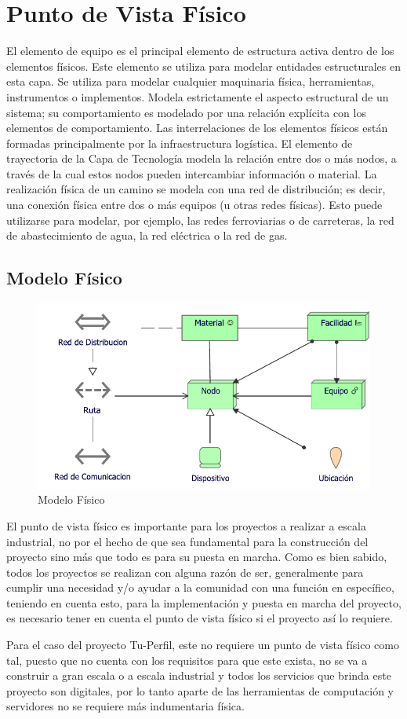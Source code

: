\section{Punto de Vista Físico}

El elemento de equipo es el principal elemento de estructura activa dentro de los elementos físicos. Este elemento se utiliza para modelar entidades estructurales en esta capa. Se utiliza para modelar cualquier maquinaria física, herramientas, instrumentos o implementos. Modela estrictamente el aspecto estructural de un sistema; su comportamiento es modelado por una relación explícita con los elementos de comportamiento.
Las interrelaciones de los elementos físicos están formadas principalmente por la infraestructura logística. El elemento de trayectoria de la Capa de Tecnología modela la relación entre dos o más nodos, a través de la cual estos nodos pueden intercambiar información o material. La realización física de un camino se modela con una red de distribución; es decir, una conexión física entre dos o más equipos (u otras redes físicas). Esto puede utilizarse para modelar, por ejemplo, las redes ferroviarias o de carreteras, la red de abastecimiento de agua, la red eléctrica o la red de gas.

\subsection{Modelo Físico}

\begin{figure}[h!]
	\centering
	\includegraphics[width=.9\linewidth]{imgs/modelo/Fisico}
	\caption{Modelo Físico}
\end{figure}

El punto de vista físico es importante para los proyectos a realizar a escala industrial, no por el hecho de que sea fundamental para la construcción del proyecto sino más que todo es para su puesta en marcha. Como es bien sabido, todos los proyectos se realizan con alguna razón de ser, generalmente para cumplir una necesidad y/o ayudar a la comunidad con una función en específico, teniendo en cuenta esto, para la implementación y puesta en marcha del proyecto, es necesario tener en cuenta el punto de vista físico si el proyecto  así lo requiere.

Para el caso del proyecto Tu-Perfil, este no requiere un punto de vista físico como tal, puesto que no cuenta con los requisitos para que este exista, no se va a construir a gran escala o a escala industrial y todos los servicios que brinda este proyecto son digitales, por lo tanto aparte de las herramientas de computación y servidores no se requiere más indumentaria física.